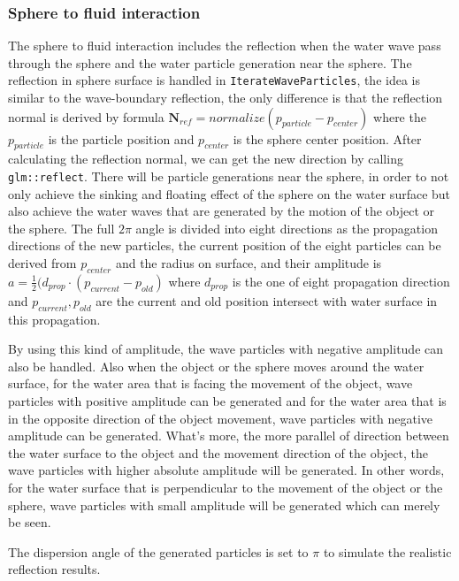 \documentclass[acmtog]{acmart}
\begin{document}
\subsubsection{Sphere to fluid interaction}
The sphere to fluid interaction includes the reflection when the water wave pass through the sphere and the water particle generation near the sphere. The reflection in sphere surface is handled in \verb|IterateWaveParticles|, the idea is similar to the wave-boundary reflection, the only difference is that the reflection normal is derived by formula $\mathbf{N}_{ref} = normalize(p_{particle} - p_{center})$ where the $p_{particle}$ is the particle position and $p_{center}$ is the sphere center position. After calculating the reflection normal, we can get the new direction by calling \verb|glm::reflect|.
There will be particle generations near the sphere, in order to not only achieve the sinking and floating effect of the sphere on the water surface but also achieve the water waves that are generated by the motion of the object or the sphere. 
The full $2\pi$ angle is divided into eight directions as the propagation directions of the new particles, the current position of the eight particles can be derived from $p_{center}$ and the radius on surface, and their amplitude is $a = \frac{1}{2} (d_{prop}\cdot (p_{current}-p_{old})$ where $d_{prop}$ is the one of eight propagation direction and $p_{current},p_{old}$ are the current and old position intersect with water surface in this propagation. 

By using this kind of amplitude, the wave particles with negative amplitude can also be handled. 
Also when the object or the sphere moves around the water surface, for the water area that is facing the movement of the object, wave particles with positive amplitude can be generated and for the water area that is in the opposite direction of the object movement, wave particles with negative amplitude can be generated. 
What's more, the more parallel of direction between the water surface to the object and the movement direction of the object, the wave particles with higher absolute amplitude will be generated. 
In other words, for the water surface that is perpendicular to the movement of the object or the sphere, wave particles with small amplitude will be generated which can merely be seen. 

The dispersion angle of the generated particles is set to $\pi$ to simulate the realistic reflection results.
\end{document}
